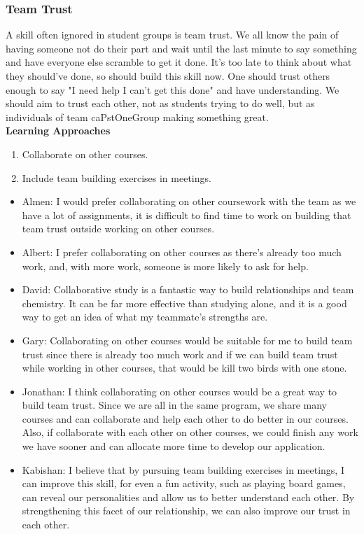\documentclass[12pt,letterpaper]{article}
\begin{document}
\subsubsection{Team Trust}
A skill often ignored in student groups is team trust. We all know the pain of
having someone not do their part and wait until the last minute to say something
and have everyone else scramble to get it done. It's too late to think about
what they should've done, so should build this skill now. One should trust
others enough to say "I need help I can't get this done" and have understanding.
We should aim to trust each other, not as students trying to do well, but as
individuals of team caPstOneGroup making something great. \\[.1in]
\noindent \textbf{Learning Approaches}
\begin{enumerate}
    \item Collaborate on other courses.
    \item Include team building exercises in meetings.
\end{enumerate}

\begin{itemize}
    \item Almen: I would prefer collaborating on other coursework with the team
    as we have a lot of assignments, it is difficult to find time to work on
    building that team trust outside working on other courses.
    \item Albert: I prefer collaborating on other courses as there's already too
    much work, and, with more work, someone is more likely to ask for help.
    \item David: Collaborative study is a fantastic way to build relationships
    and team chemistry. It can be far more effective than studying alone, and it
    is a good way to get an idea of what my teammate's strengths are.
    \item Gary: Collaborating on other courses would be suitable for me to build
    team trust since there is already too much work and if we can build team
    trust while working in other courses, that would be kill two birds with one
    stone.
    \item Jonathan: I think collaborating on other courses would be a great way
    to build team trust. Since we are all in the same program, we share many
    courses and can collaborate and help each other to do better in our courses.
    Also, if collaborate with each other on other courses, we could finish any
    work we have sooner and can allocate more time to develop our application.
    \item Kabishan: I believe that by pursuing team building exercises in
    meetings, I can improve this skill, for even a fun activity, such as playing
    board games, can reveal our personalities and allow us to better understand
    each other. By strengthening this facet of our relationship, we can also
    improve our trust in each other.
\end{itemize}
\end{document}
